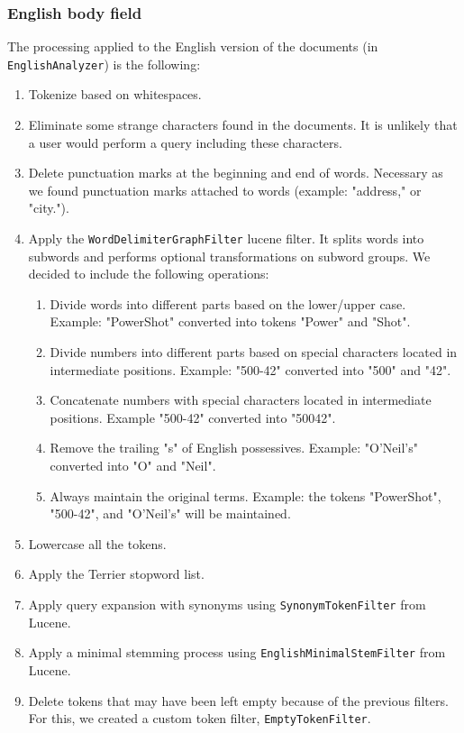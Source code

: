 \subsubsection{English body field}
The processing applied to the English version of the documents (in \texttt{EnglishAnalyzer}) is the following:
\begin{enumerate}
    \item Tokenize based on whitespaces.
    \item Eliminate some strange characters found in the documents.
    It is unlikely that a user would perform a query including these characters.
    \item Delete punctuation marks at the beginning and end of words.
    Necessary as we found punctuation marks attached to words (example: "address," or "city.").
    \item Apply the \texttt{WordDelimiterGraphFilter} lucene filter.
    It splits words into subwords and performs optional transformations on subword groups.
    We decided to include the following operations:
    \begin{enumerate}
        \item Divide words into different parts based on the lower/upper case.
        Example: "PowerShot" converted into tokens "Power" and "Shot".
        \item Divide numbers into different parts based on special characters located in intermediate positions.
        Example: "500-42" converted into "500" and "42".
        \item Concatenate numbers with special characters located in intermediate positions.
        Example "500-42" converted into "50042".
        \item Remove the trailing "s" of English possessives.
        Example: "O'Neil's" converted into "O" and "Neil".
        \item Always maintain the original terms.
        Example: the tokens "PowerShot", "500-42", and "O'Neil's" will be maintained.
    \end{enumerate}
    \item Lowercase all the tokens.
    \item Apply the Terrier stopword list. %
    \item Apply query expansion with synonyms using \texttt{SynonymTokenFilter} from Lucene. %
    \item Apply a minimal stemming process using \texttt{EnglishMinimalStemFilter} from Lucene.
    \item Delete tokens that may have been left empty because of the previous filters.
    For this, we created a custom token filter, \texttt{EmptyTokenFilter}.
\end{enumerate}

